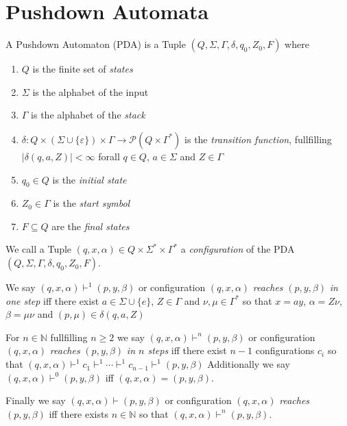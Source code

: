 \chapter{Pushdown Automata}
\setlength{\parindent}{0pt}
\setlength{\parskip}{10pt}

\begin{definition}
  \label{def:PDA}
  A Pushdown Automaton (PDA) is a Tuple $(Q,\Sigma,\Gamma,\delta,q_0,Z_0,F)$ where
  \begin{enumerate}
    \item $Q$ is the finite set of \emph{states}
    \item $\Sigma$ is the alphabet of the input
    \item $\Gamma$ is the alphabet of the \emph{stack}
    \item $\delta : Q\times(\Sigma\cup\{\varepsilon\})\times\Gamma\to\mathcal{P}(Q\times\Gamma^*)$
      is the \emph{transition function}, fullfilling $|\delta(q,a,Z)|<\infty$ forall $q\in Q$,
      $a\in\Sigma$ and $Z \in \Gamma$
    \item $q_0\in Q$ is the \emph{initial state}
    \item $Z_0 \in \Gamma$ is the \emph{start symbol}
    \item $F\subseteq Q$ are the \emph{final states}
  \end{enumerate}
\end{definition}

\begin{definition}
  \label{def:PDA_conf}
  We call a Tuple $(q,x,\alpha)\in Q\times\Sigma^*\times\Gamma^*$ a \emph{configuration} of the PDA
  $(Q,\Sigma,\Gamma,\delta,q_0,Z_0,F)$.


\end{definition}
\begin{definition}
  \label{def:PDA_reaches}
  We say $(q,x,\alpha)\vdash^1(p,y,\beta)$ or configuration $(q,x,\alpha)$ \emph{reaches} $(p,y,\beta)$
  \emph{in one step} iff there exist $a\in\Sigma\cup\{e\}$, $Z\in\Gamma$
  and $\nu,\mu \in \Gamma^*$ so that  $x=ay$, $\alpha=Z\nu$,
  $\beta=\mu\nu$ and $(p,\mu)\in\delta(q,a,Z)$

  For $n\in\mathbb{N}$ fullfilling $n\ge 2$
  we say $(q,x,\alpha)\vdash^n(p,y,\beta)$ or configuration $(q,x,\alpha)$ \emph{reaches} $(p,y,\beta)$
  \emph{in $n$ steps} iff there exist $n-1$ configurations $c_i$ so that
  $(q,x,\alpha)\vdash^1c_1\vdash^1\cdots\vdash^1c_{n-1}\vdash^1(p,y,\beta)$
  Additionally we say $(q,x,\alpha)\vdash^0(p,y,\beta)$ iff $(q,x,\alpha)=(p,y,\beta)$.

  Finally we say $(q,x,\alpha)\vdash(p,y,\beta)$ or configuration $(q,x,\alpha)$ \emph{reaches}
  $(p,y,\beta)$ iff there exists $n\in\mathbb{N}$ so that $(q,x,\alpha)\vdash^n(p,y,\beta)$.

\end{definition}

